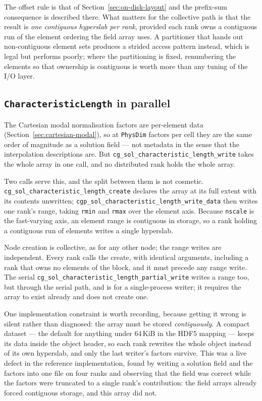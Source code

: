 \documentclass[11pt,letterpaper]{article}
\newif\ifvfourdraft
\newenvironment{v4block}{\ifvfourdraft\color{v4violet}\fi\ignorespaces}{\par}
\newcommand{\vfourmark}{\ifvfourdraft\textcolor{v4violet}{\textbf{[v4]}}\ \fi}
\begin{document}
\begin{v4block}
The offset rule is that of Section~\ref{sec:on-disk-layout} and the prefix-sum
consequence is described there.  What matters for the collective path is that the
result is \emph{one contiguous hyperslab per rank}, provided each rank owns a
contiguous run of the element ordering the field array uses.  A partitioner that
hands out non-contiguous element sets produces a strided access pattern instead,
which is legal but performs poorly; where the partitioning is fixed, renumbering
the elements so that ownership is contiguous is worth more than any tuning of the
I/O layer.

\subsection{\texttt{CharacteristicLength} in parallel}

The Cartesian modal normalisation factors are per-element data
(Section~\ref{sec:cartesian-modal}), so at \texttt{PhysDim} factors per cell they
are the same order of magnitude as a solution field --- not metadata in the
sense that the interpolation descriptions are.  But
\texttt{cg\_sol\_characteristic\_length\_write} takes the whole array in one
call, and no distributed rank holds the whole array.

Two calls serve this, and the split between them is not cosmetic.
\texttt{cg\_sol\_characteristic\_length\_create} declares the array at its full
extent with its contents unwritten; \texttt{cgp\_sol\_characteristic\_length\_write\_data}
then writes one rank's range, taking \texttt{rmin} and \texttt{rmax} over the
element axis.  Because \texttt{nscale} is the fast-varying axis, an element range
is contiguous in storage, so a rank holding a contiguous run of elements writes a
single hyperslab.

Node creation is collective, as for any other node; the range writes are
independent.  Every rank calls the create, with identical arguments, including a
rank that owns no elements of the block, and it must precede any range write.
The serial \texttt{cg\_sol\_characteristic\_length\_partial\_write} writes a range
too, but through the serial path, and is for a single-process writer; it requires
the array to exist already and does not create one.

\vfourmark One implementation constraint is worth recording, because getting it
wrong is silent rather than diagnosed: the array must be stored
\emph{contiguously}.  A compact dataset --- the default for anything under
64\,KiB in the HDF5 mapping --- keeps its data inside the object header, so each
rank rewrites the whole object instead of its own hyperslab, and only the last
writer's factors survive.  This was a live defect in the reference
implementation, found by writing a solution field and the factors into one file
on four ranks and observing that the field was correct while the factors were
truncated to a single rank's contribution: the field arrays already forced
contiguous storage, and this array did not.


\end{v4block}
\end{document}
